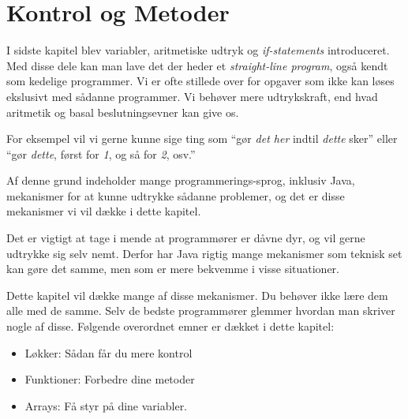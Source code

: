 

\chapter{Kontrol og Metoder}





    I sidste kapitel blev variabler, aritmetiske udtryk og
    \emph{if-statements} introduceret. Med disse dele kan man lave det
    der heder et \emph{straight-line program}, også kendt som kedelige
    programmer. Vi er ofte stillede over for opgaver som ikke kan
    løses ekslusivt med sådanne programmer. Vi behøver mere
    udtrykskraft, end hvad aritmetik og basal beslutningsevner kan
    give os.

    For eksempel vil vi gerne kunne sige ting som ``gør \emph{det her} indtil
	\emph{dette} sker'' eller ``gør \emph{dette}, først for \emph{1}, og så for
	\emph{2}, osv.''

	Af denne grund indeholder mange programmerings-sprog, inklusiv Java,
	mekanismer for at kunne udtrykke sådanne problemer, og det er disse
	mekanismer vi vil dække i dette kapitel.

	Det er vigtigt at tage i mende at programmører er dåvne dyr, og vil gerne
	udtrykke sig selv nemt. Derfor har Java rigtig mange mekanismer som teknisk
	set kan gøre det samme, men som er mere bekvemme i visse situationer.


    Dette kapitel vil dække mange af disse mekanismer. Du behøver ikke
    lære dem alle med de samme. Selv de bedste programmører glemmer
    hvordan man skriver nogle af disse. Følgende overordnet emner er
    dækket i dette kapitel:

	\begin{itemize} %
		\item Løkker: Sådan får du mere kontrol
		\item Funktioner: Forbedre dine metoder
		\item Arrays: Få styr på dine variabler.
	\end{itemize}

